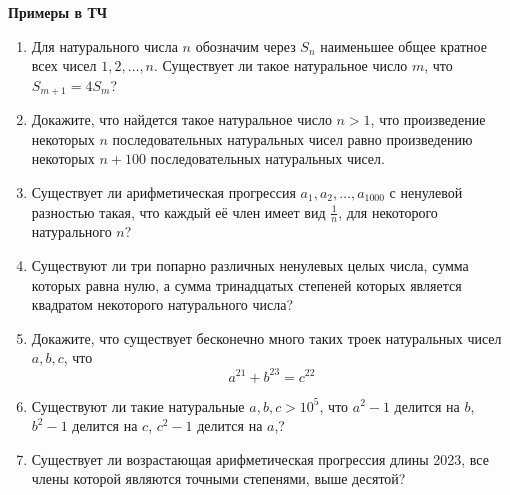 \documentclass{article}
\begin{document}
\large
	
\begin{center}
	\textbf{Примеры в ТЧ}
\end{center}


\begin{enumerate}[label*=\protect\fbox{\arabic{enumi}}]
	
\item Для натурального числа $n$ обозначим через $S_n$ наименьшее общее кратное всех чисел $1, 2, \dotsc , n$. Существует ли такое натуральное число $m$, что $S_{m+1} = 4S_m$? 

\item Докажите, что найдется такое натуральное число $n > 1$, что произведение некоторых $n$ последовательных натуральных чисел равно произведению некоторых $n+100$ последовательных натуральных чисел.

\item Существует ли арифметическая прогрессия $a_1, a_2, \dotsc, a_{1000}$ с ненулевой разностью такая, что каждый её член имеет вид $\frac{1}{n}$, для некоторого натурального $n$?

\item Существуют ли три попарно различных ненулевых целых числа, сумма которых равна нулю, а сумма тринадцатых степеней которых является квадратом некоторого натурального числа?

\item Докажите, что существует бесконечно много таких троек натуральных чисел $a, b, c$, что $$a^{21} + b^{23} = c^{22}$$

\item Существуют ли такие натуральные $a, b, c > 10^5$, что $a^2 - 1$ делится на $b$, $b^2 - 1$ делится на $c$, $c^2 - 1$ делится на $a$,?

\item Существует ли возрастающая арифметическая прогрессия длины 2023, все члены которой являются точными степенями, выше десятой?


\end{enumerate}
\end{document}
